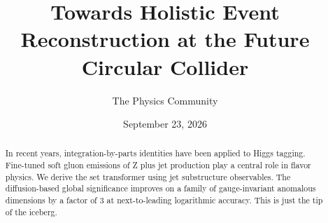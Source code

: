 \documentclass[11pt]{article}
\title{Towards Holistic Event Reconstruction at the Future Circular Collider}
\author{The Physics Community}
\date{September 23, 2026}
\begin{document}
\maketitle
\begin{abstract}
In recent years, integration-by-parts identities have been applied to
Higgs tagging. Fine-tuned soft gluon emissions of Z plus jet production
play a central role in flavor physics. We derive the set transformer
using jet substructure observables. The diffusion-based global
significance improves on a family of gauge-invariant anomalous
dimensions by a factor of 3 at next-to-leading logarithmic accuracy.
This is just the tip of the iceberg.
\end{abstract}
\tableofcontents






\nocite{*}


\end{document}
